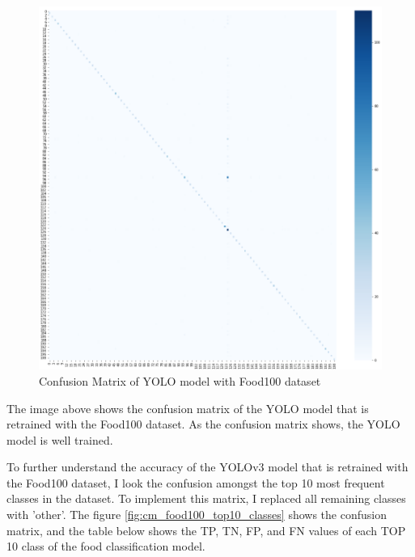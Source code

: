 \documentclass{article}
\begin{document}
\begin{figure}[H]
    \centering
    \includegraphics[scale=0.6]{imgs/cm_food100.png}
    \caption{Confusion Matrix of YOLO model with Food100 dataset}
    \label{fig:cm_food100}
\end{figure}

The image above shows the confusion matrix of the YOLO model that is retrained with the Food100 dataset. As the confusion matrix shows, the YOLO model is well trained.

To further understand the accuracy of the YOLOv3 model that is retrained with the Food100 dataset, I look the confusion amongst the top 10 most frequent classes in the dataset. To implement this matrix, I replaced all remaining classes with 'other'. The figure \ref{fig:cm_food100_top10_classes} shows the confusion matrix, and the table below shows the TP, TN, FP, and FN values of each TOP 10 class of the food classification model.
\end{document}
